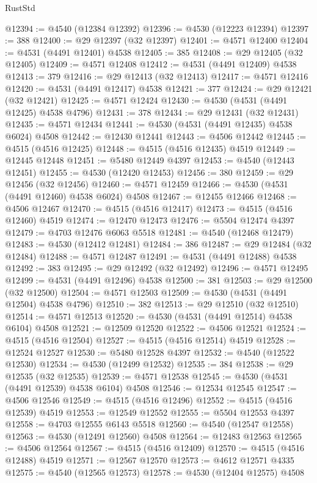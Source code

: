 \begin{lexlean}{RustStd}
\begin{coremodule}
{\begin{coremodule}
{{{{{{{{{{{{{{{{{{{{{{{{{{{{{{{{{{{{{{{{{{{{{{{{{{{{{{{@12394 := @4540 (@12384 @12392)
@12396 := @4530 (@12223 @12394)
@12397 := 388
@12400 := @29 @12397 (@32 @12397)
@12401 := @4571 @12400
@12404 := @4531 (@4491 @12401) @4538
@12405 := 385
@12408 := @29 @12405 (@32 @12405)
@12409 := @4571 @12408
@12412 := @4531 (@4491 @12409) @4538
@12413 := 379
@12416 := @29 @12413 (@32 @12413)
@12417 := @4571 @12416
@12420 := @4531 (@4491 @12417) @4538
@12421 := 377
@12424 := @29 @12421 (@32 @12421)
@12425 := @4571 @12424
@12430 := @4530 (@4531 (@4491 @12425) @4538 @4796)
@12431 := 378
@12434 := @29 @12431 (@32 @12431)
@12435 := @4571 @12434
@12441 := @4530 (@4531 (@4491 @12435) @4538 @6024) @4508
@12442 := @12430 @12441
@12443 := @4506 @12442
@12445 := @4515 (@4516 @12425)
@12448 := @4515 (@4516 @12435) @4519
@12449 := @12445 @12448
@12451 := @5480 @12449 @4397
@12453 := @4540 (@12443 @12451)
@12455 := @4530 (@12420 @12453)
@12456 := 380
@12459 := @29 @12456 (@32 @12456)
@12460 := @4571 @12459
@12466 := @4530 (@4531 (@4491 @12460) @4538 @6024) @4508
@12467 := @12455 @12466
@12468 := @4506 @12467
@12470 := @4515 (@4516 @12417)
@12473 := @4515 (@4516 @12460) @4519
@12474 := @12470 @12473
@12476 := @5504 @12474 @4397
@12479 := @4703 @12476 @6063 @5518
@12481 := @4540 (@12468 @12479)
@12483 := @4530 (@12412 @12481)
@12484 := 386
@12487 := @29 @12484 (@32 @12484)
@12488 := @4571 @12487
@12491 := @4531 (@4491 @12488) @4538
@12492 := 383
@12495 := @29 @12492 (@32 @12492)
@12496 := @4571 @12495
@12499 := @4531 (@4491 @12496) @4538
@12500 := 381
@12503 := @29 @12500 (@32 @12500)
@12504 := @4571 @12503
@12509 := @4530 (@4531 (@4491 @12504) @4538 @4796)
@12510 := 382
@12513 := @29 @12510 (@32 @12510)
@12514 := @4571 @12513
@12520 := @4530 (@4531 (@4491 @12514) @4538 @6104) @4508
@12521 := @12509 @12520
@12522 := @4506 @12521
@12524 := @4515 (@4516 @12504)
@12527 := @4515 (@4516 @12514) @4519
@12528 := @12524 @12527
@12530 := @5480 @12528 @4397
@12532 := @4540 (@12522 @12530)
@12534 := @4530 (@12499 @12532)
@12535 := 384
@12538 := @29 @12535 (@32 @12535)
@12539 := @4571 @12538
@12545 := @4530 (@4531 (@4491 @12539) @4538 @6104) @4508
@12546 := @12534 @12545
@12547 := @4506 @12546
@12549 := @4515 (@4516 @12496)
@12552 := @4515 (@4516 @12539) @4519
@12553 := @12549 @12552
@12555 := @5504 @12553 @4397
@12558 := @4703 @12555 @6143 @5518
@12560 := @4540 (@12547 @12558)
@12563 := @4530 (@12491 @12560) @4508
@12564 := @12483 @12563
@12565 := @4506 @12564
@12567 := @4515 (@4516 @12409)
@12570 := @4515 (@4516 @12488) @4519
@12571 := @12567 @12570
@12573 := @4612 @12571 @4335
@12575 := @4540 (@12565 @12573)
@12578 := @4530 (@12404 @12575) @4508
}}}}}}}}}}}}}}}}}}}}}}}}}}}}}}}}}}}}}}}}}}}}}}}}}}}}}}}
\end{coremodule}}
\end{coremodule}
\end{lexlean}
